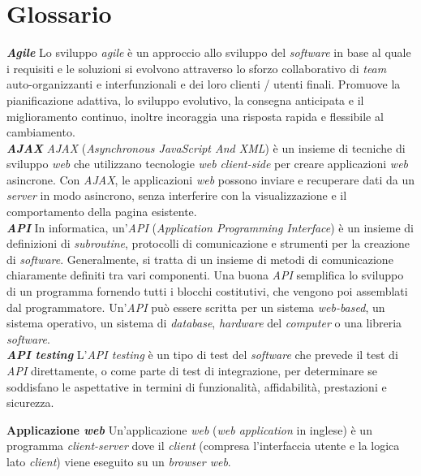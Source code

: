 \chapter{Glossario} \label{gloss}


\hspace{15pt}\textbf{\textit{Agile}} Lo sviluppo \textit{agile} è un approccio allo sviluppo del \textit{software} in base al quale i requisiti e le soluzioni si evolvono attraverso lo sforzo collaborativo di \textit{team} auto-organizzanti e interfunzionali e dei loro clienti / utenti finali. Promuove la pianificazione adattiva, lo sviluppo evolutivo, la consegna anticipata e il miglioramento continuo, inoltre incoraggia una risposta rapida e flessibile al cambiamento.\\

\textbf{\textit{AJAX}} \textit{AJAX} (\textit{Asynchronous JavaScript And XML}) è un insieme di tecniche di sviluppo \textit{web} che utilizzano tecnologie \textit{web} \textit{client-side} per creare applicazioni \textit{web} asincrone. Con \textit{AJAX}, le applicazioni \textit{web} possono inviare e recuperare dati da un \textit{server} in modo asincrono, senza interferire con la visualizzazione e il comportamento della pagina esistente.\\

\textbf{\textit{API}} In informatica, un'\textit{API} (\textit{Application Programming Interface}) è un insieme di definizioni di \textit{subroutine}, protocolli di comunicazione e strumenti per la creazione di \textit{software}. Generalmente, si tratta di un insieme di metodi di comunicazione chiaramente definiti tra vari componenti. Una buona \textit{API} semplifica lo sviluppo di un programma fornendo tutti i blocchi costitutivi, che vengono poi assemblati dal programmatore. Un'\textit{API} può essere scritta per un sistema \textit{web-based}, un sistema operativo, un sistema di \textit{database}, \textit{hardware} del \textit{computer} o una libreria \textit{software}.\\

\textbf{\textit{API testing}} L'\textit{API testing} è un tipo di test del \textit{software} che prevede il test di \textit{API} direttamente, o come parte di test di integrazione, per determinare se soddisfano le aspettative in termini di funzionalità, affidabilità, prestazioni e sicurezza.

\textbf{Applicazione \textit{web}} Un'applicazione \textit{web} (\textit{web application} in inglese) è un programma \textit{client-server} dove il \textit{client} (compresa l'interfaccia utente e la logica lato \textit{client}) viene eseguito su un \textit{browser web}.\\

